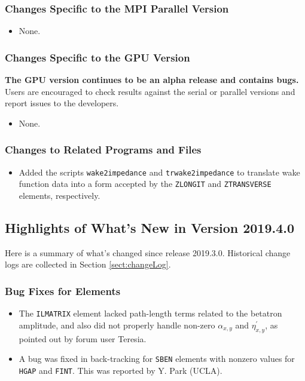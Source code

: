 \documentclass[11pt]{article}
\begin{document}
\subsubsection{Changes Specific to the MPI Parallel Version}

\begin{itemize}
\item None.
\end{itemize}

\subsubsection{Changes Specific to the GPU Version}

{\bf The GPU version continues to be an alpha release and contains bugs.}
Users are encouraged to check results against the serial or parallel versions and report issues to the developers.

\begin{itemize}
\item None.
\end{itemize}

\subsubsection{Changes to Related Programs and Files}

\begin{itemize}
\item Added the scripts \verb|wake2impedance| and \verb|trwake2impedance| to translate wake function data into a
  form accepted by the \verb|ZLONGIT| and \verb|ZTRANSVERSE| elements, respectively.
\end{itemize}

\subsection{Highlights of What's New in Version 2019.4.0}

Here is a summary of what's changed since release 2019.3.0.
Historical change logs are collected in Section \ref{sect:changeLog}.

\subsubsection{Bug Fixes for Elements}

\begin{itemize}
\item The \verb|ILMATRIX| element lacked path-length terms related to the betatron amplitude, and 
  also did not properly handle non-zero $\alpha_{x,y}$ and $\eta_{x,y}^\prime$, as pointed out
  by forum user Teresia.
\item A bug was fixed in back-tracking for \verb|SBEN| elements with nonzero values for \verb|HGAP| and \verb|FINT|.
  This was reported by Y. Park (UCLA).
\end{itemize}
\end{document}
